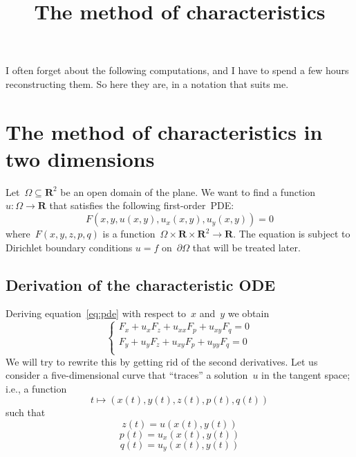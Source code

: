 
\newcommand{\ud}{\mathrm{d}}
\newcommand{\R}{\mathbf{R}}

\newcommand{\x}{\mathbf{x}}
\newcommand{\y}{\mathbf{y}}
\newcommand{\p}{\mathbf{p}}

\title{The method of characteristics}

I often forget about the following computations, and I have to spend a few hours
reconstructing them.
So here they are, in a notation that suits me.

\section{The method of characteristics in two dimensions}


Let~$\Omega\subseteq\R^2$ be an open domain of the plane.
We want to find a function~$u:\Omega\to\R$
that satisfies the following first-order~PDE:
\begin{equation}\label{eq:pde}
		F\left(x, y, u(x,y), u_x(x,y), u_y(x,y)\right)=0
\end{equation}
where~$F(x,y,z,p,q)$ is a function~$\Omega\times\R\times\R^2\to\R$.
The equation is subject to Dirichlet boundary conditions
$u=f$ on~$\partial\Omega$
that will be treated later.

\subsection{Derivation of the characteristic ODE}
Deriving equation~\ref{eq:pde} with respect to~$x$ and~$y$ we obtain
\begin{equation}\label{eq:gradpde}
	\begin{cases}
		F_x + u_xF_z + u_{xx}F_p + u_{xy}F_q = 0\\
		F_y + u_yF_z + u_{xy}F_p + u_{yy}F_q = 0\\
	\end{cases}
\end{equation}
We will try to rewrite this by getting rid of the second derivatives.  Let us
consider a five-dimensional curve that ``traces'' a solution~$u$ in the
tangent space; i.e., a function
\begin{equation*}
	t\mapsto\left(
		x(t),y(t),z(t),p(t),q(t)
	\right)
\end{equation*}
such that
\begin{equation}
	z(t)=u\left(x(t),y(t)\right)
\end{equation}
\begin{equation}
	p(t)=u_x\left(x(t),y(t)\right)
\end{equation}
\begin{equation}
	q(t)=u_y\left(x(t),y(t)\right)
\end{equation}

